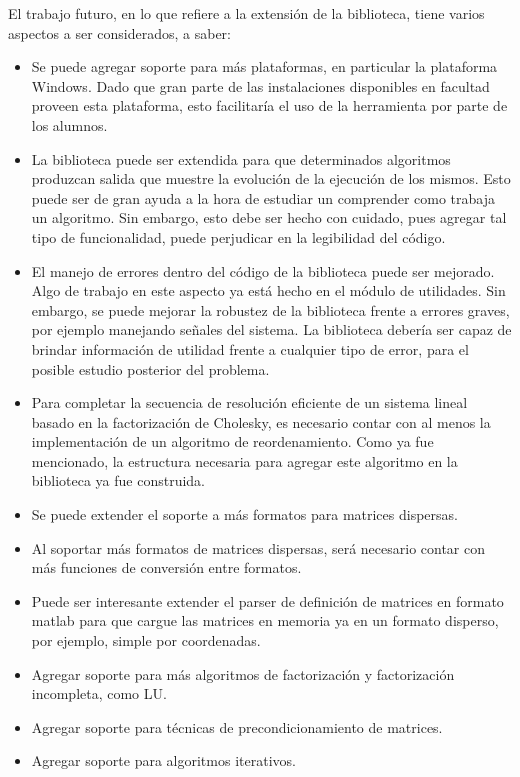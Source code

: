 \documentclass[a4paper,10pt]{article}
\begin{document}
El trabajo futuro, en lo que refiere a la extensión de la biblioteca, tiene varios aspectos a ser considerados, a saber:
\begin{itemize}
 \item Se puede agregar soporte para más plataformas, en particular la plataforma Windows. Dado que gran parte de las instalaciones disponibles en facultad proveen esta plataforma, esto facilitaría el uso de la herramienta por parte de los alumnos.
 \item La biblioteca puede ser extendida para que determinados algoritmos produzcan salida que muestre la evolución de la ejecución de los mismos. Esto puede ser de gran ayuda a la hora de estudiar un comprender como trabaja un algoritmo. Sin embargo, esto debe ser hecho con cuidado, pues agregar tal tipo de funcionalidad, puede perjudicar en la legibilidad del código.
\item El manejo de errores dentro del código de la biblioteca puede ser mejorado. Algo de trabajo en este aspecto ya está hecho en el módulo de utilidades. Sin embargo, se puede mejorar la robustez de la biblioteca frente a errores graves, por ejemplo manejando señales del sistema. La biblioteca debería ser capaz de brindar información de utilidad frente a cualquier tipo de error, para el posible estudio posterior del problema.
\item Para completar la secuencia de resolución eficiente de un sistema lineal basado en la factorización de Cholesky, es necesario contar con al menos la implementación de un algoritmo de reordenamiento. Como ya fue mencionado, la estructura necesaria para agregar este algoritmo en la biblioteca ya fue construida.
\item Se puede extender el soporte a más formatos para matrices dispersas.
\item Al soportar más formatos de matrices dispersas, será necesario contar con más funciones de conversión entre formatos.
\item Puede ser interesante extender el parser de definición de matrices en formato matlab para que cargue las matrices en memoria ya en un formato disperso, por ejemplo, simple por coordenadas.
\item Agregar soporte para más algoritmos de factorización y factorización incompleta, como LU.
\item Agregar soporte para técnicas de precondicionamiento de matrices.
\item Agregar soporte para algoritmos iterativos.
\end{itemize}
\end{document}
